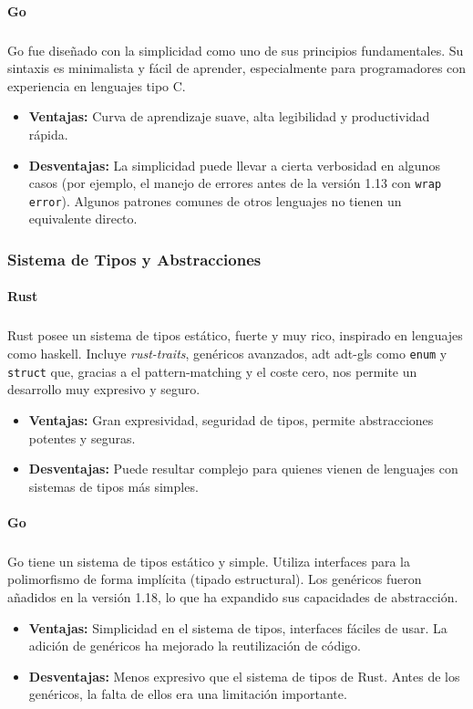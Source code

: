 \paragraph{Go}
\subparagraph{}

Go fue diseñado con la simplicidad como uno de sus principios fundamentales. Su sintaxis es minimalista y fácil de aprender, especialmente para programadores con experiencia en lenguajes tipo C.
\begin{itemize}
    \item \textbf{Ventajas:} Curva de aprendizaje suave, alta legibilidad y productividad rápida.
    \item \textbf{Desventajas:} La simplicidad puede llevar a cierta verbosidad en algunos casos (por ejemplo, el manejo de errores antes de la versión 1.13 con \texttt{wrap error}). Algunos patrones comunes de otros lenguajes no tienen un equivalente directo.
\end{itemize}

\subsubsection{Sistema de Tipos y Abstracciones}
\paragraph{Rust}
\subparagraph{}

Rust posee un sistema de tipos estático, fuerte y muy rico, inspirado en lenguajes como \gls{haskell}. Incluye \textit{\gls{rust-traits}}, genéricos avanzados, \acrlong{adt} \gls{adt-gls} como \texttt{enum} y \texttt{struct} que, gracias a el \gls{pattern-matching} y el coste cero, nos permite un desarrollo muy expresivo y seguro.
\begin{itemize}
    \item \textbf{Ventajas:} Gran expresividad, seguridad de tipos, permite abstracciones potentes y seguras.
    \item \textbf{Desventajas:} Puede resultar complejo para quienes vienen de lenguajes con sistemas de tipos más simples.
\end{itemize}

\paragraph{Go}
\subparagraph{}

Go tiene un sistema de tipos estático y simple. Utiliza interfaces para la polimorfismo de forma implícita (tipado estructural). Los genéricos fueron añadidos en la versión 1.18, lo que ha expandido sus capacidades de abstracción.
\begin{itemize}
    \item \textbf{Ventajas:} Simplicidad en el sistema de tipos, interfaces fáciles de usar. La adición de genéricos ha mejorado la reutilización de código.
    \item \textbf{Desventajas:} Menos expresivo que el sistema de tipos de Rust. Antes de los genéricos, la falta de ellos era una limitación importante.
\end{itemize}

